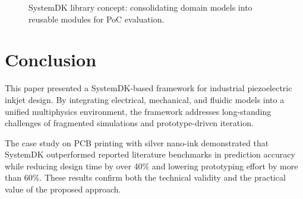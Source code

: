 \documentclass[conference]{IEEEtran}
\begin{document}
\begin{figure}[t]
\centering
{}
\caption{SystemDK library concept: consolidating domain models into reusable modules for PoC evaluation.}
\label{fig:systemdk_library}
\end{figure}

\section{Conclusion}
This paper presented a SystemDK-based framework for industrial piezoelectric inkjet design.  
By integrating electrical, mechanical, and fluidic models into a unified multiphysics environment, the framework addresses long-standing challenges of fragmented simulations and prototype-driven iteration.  

The case study on PCB printing with silver nano-ink demonstrated that SystemDK outperformed reported literature benchmarks in prediction accuracy while reducing design time by over 40\% and lowering prototyping effort by more than 60\%.  
These results confirm both the technical validity and the practical value of the proposed approach.  
\end{document}
